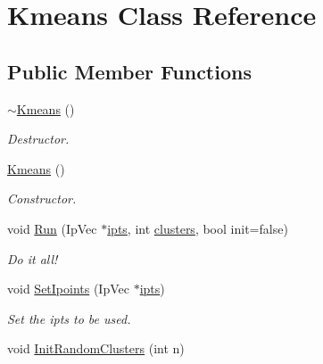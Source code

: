 \hypertarget{classKmeans}{\section{Kmeans Class Reference}
\label{classKmeans}
}
\subsection*{Public Member Functions}
\begin{DoxyCompactItemize}
\item 
\hypertarget{classKmeans_a198e4d588262f44d6ebe058796d2860e}{\hyperlink{classKmeans_a198e4d588262f44d6ebe058796d2860e}{$\sim$\-Kmeans} ()}\label{classKmeans_a198e4d588262f44d6ebe058796d2860e}

\begin{DoxyCompactList}\small\item\em Destructor. \end{DoxyCompactList}\item 
\hypertarget{classKmeans_aaa368f4f88d4c671fdd92c6ba525822a}{\hyperlink{classKmeans_aaa368f4f88d4c671fdd92c6ba525822a}{Kmeans} ()}\label{classKmeans_aaa368f4f88d4c671fdd92c6ba525822a}

\begin{DoxyCompactList}\small\item\em Constructor. \end{DoxyCompactList}\item 
\hypertarget{classKmeans_ae65400ea2ab42ecb1a462a291739f871}{void \hyperlink{classKmeans_ae65400ea2ab42ecb1a462a291739f871}{Run} (Ip\-Vec $\ast$\hyperlink{classKmeans_abed0349d08279cf3bc8884bf47057b86}{ipts}, int \hyperlink{classKmeans_a934a2bb64012d84c3b8f5d34dbd63237}{clusters}, bool init=false)}\label{classKmeans_ae65400ea2ab42ecb1a462a291739f871}

\begin{DoxyCompactList}\small\item\em Do it all! \end{DoxyCompactList}\item 
\hypertarget{classKmeans_a158fafaadf2e13f857ce6f134d7186ae}{void \hyperlink{classKmeans_a158fafaadf2e13f857ce6f134d7186ae}{Set\-Ipoints} (Ip\-Vec $\ast$\hyperlink{classKmeans_abed0349d08279cf3bc8884bf47057b86}{ipts})}\label{classKmeans_a158fafaadf2e13f857ce6f134d7186ae}

\begin{DoxyCompactList}\small\item\em Set the ipts to be used. \end{DoxyCompactList}\item 
\hypertarget{classKmeans_a7b217a72a901c90254bd5673bb76f038}{void \hyperlink{classKmeans_a7b217a72a901c90254bd5673bb76f038}{Init\-Random\-Clusters} (int n)}\label{classKmeans_a7b217a72a901c90254bd5673bb76f038}


\end{DoxyCompactItemize}
